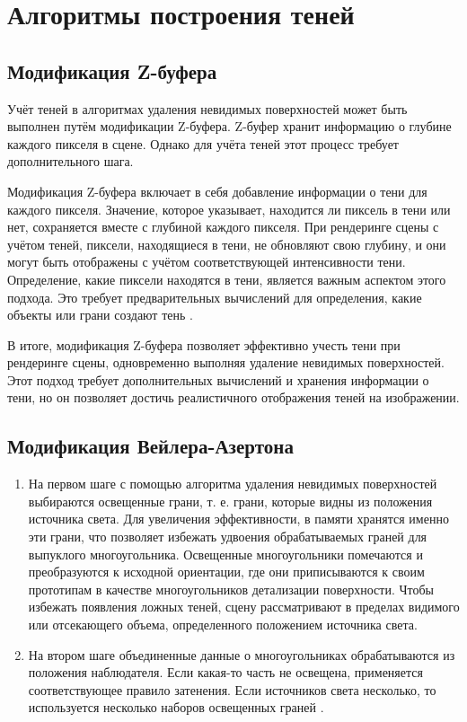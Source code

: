 \section{Алгоритмы построения теней}

\subsection{Модификация  Z-буфера}
Учёт теней в алгоритмах удаления невидимых поверхностей может быть выполнен путём модификации Z-буфера. Z-буфер хранит информацию о глубине каждого пикселя в сцене. Однако для учёта теней этот процесс требует дополнительного шага. 

Модификация Z-буфера включает в себя добавление информации о тени для каждого пикселя. Значение, которое указывает, находится ли пиксель в тени или нет, сохраняется вместе с глубиной каждого пикселя.  При рендеринге сцены с учётом теней, пиксели, находящиеся в тени, не обновляют свою глубину, и они могут быть отображены с учётом соответствующей интенсивности тени. Определение, какие пиксели находятся в тени, является важным аспектом этого подхода. Это требует предварительных вычислений для определения, какие объекты или грани создают тень \cite{letion}.

В итоге, модификация Z-буфера позволяет эффективно учесть тени при рендеринге сцены, одновременно выполняя удаление невидимых поверхностей. Этот подход требует дополнительных вычислений и хранения информации о тени, но он позволяет достичь реалистичного отображения теней на изображении.



\subsection{Модификация Вейлера-Азертона}


\begin{enumerate}
\item На первом шаге с помощью алгоритма удаления невидимых поверхностей выбираются освещенные грани, т. е. грани, которые видны из положения источника света. Для увеличения эффективности, в памяти хранятся именно эти грани, что позволяет избежать удвоения обрабатываемых граней для выпуклого многоугольника. Освещенные многоугольники помечаются и преобразуются к исходной ориентации, где они приписываются к своим прототипам в качестве многоугольников детализации поверхности. Чтобы избежать появления ложных теней, сцену рассматривают в пределах видимого или отсекающего объема, определенного положением источника света.
\item На втором шаге объединенные данные о многоугольниках обрабатываются из положения наблюдателя. Если какая-то часть не освещена, применяется соответствующее правило затенения. Если источников света несколько, то используется несколько наборов освещенных граней \cite{letion}.
\end{enumerate}

